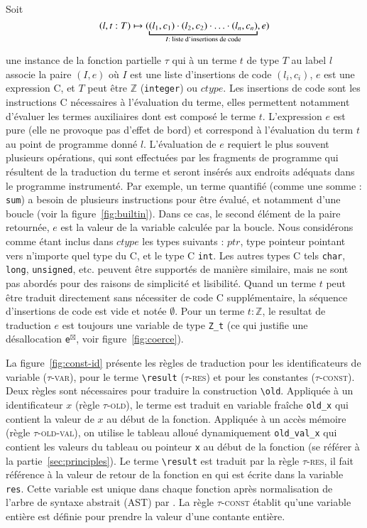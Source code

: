 

Soit
\[
(l, t:T) \rulearrow (\underbracket{(l_1, c_1) \concat (l_2, c_2) \concat \ldots
  \concat (l_n, c_n)}_{I : \text{ liste d'insertions de code}}, e)
\]

une instance de la fonction partielle $\tau$ qui à un terme \eacsl $t$ de type
$T$ au label $l$ associe la paire $(I, e)$ où $I$ est une liste d'insertions de
code $(l_i, c_i)$, $e$ est une expression C, et $T$ peut être $\mathbb{Z}$
(\lstinline'integer') ou $ctype$.
Les insertions de code sont les instructions C nécessaires à l'évaluation du
terme, elles permettent notamment d'évaluer les termes auxiliaires dont est
composé le terme $t$.
L'expression $e$ est pure (elle ne provoque pas d'effet de bord) et correspond
à l'évaluation du term $t$ au point de programme donné $l$.
L'évaluation de $e$ requiert le plus souvent plusieurs opérations, qui sont
effectuées par les fragments de programme qui résultent de la traduction du
terme et seront insérés aux endroits adéquats dans le programme instrumenté.
Par exemple, un terme quantifié (comme une somme : \lstinline'sum') a besoin de
plusieurs instructions pour être évalué, et notamment d'une boucle (voir la
figure~\ref{fig:builtin}).
Dans ce cas, le second élément de la paire retournée, $e$ est la valeur de la
variable calculée par la boucle.
Nous considérons comme étant inclus dans $ctype$ les types suivants : $ptr$,
type pointeur pointant vers n'importe quel type du C, et le type C
\lstinline'int'.
Les autres types C tels \lstinline'char', \lstinline'long',
\lstinline'unsigned', etc. peuvent être supportés de manière similaire, mais ne
sont pas abordés pour des raisons de simplicité et lisibilité.
Quand un terme $t$ peut être traduit directement sans nécessiter de code C
supplémentaire, la séquence d'insertions de code est vide et notée $\emptyset$.
Pour un terme $t:\mathbb{Z}$, le resultat de traduction $e$ est toujours une
variable de type \lstinline'Z_t' (ce qui justifie une désallocation
\lstinline{e}${}^{\boxtimes}$, voir figure~\ref{fig:coerce}).

La figure~\ref{fig:const-id} présente les règles de traduction pour les
identificateurs de variable (\textsc{$\tau$-var}), pour le terme
\lstinline|\result| (\textsc{$\tau$-res}) et pour les constantes
(\textsc{$\tau$-const}).
Deux règles sont nécessaires pour traduire la construction \eacsl
\lstinline|\old|.
Appliquée à un identificateur $x$ (règle \textsc{$\tau$-old}), le terme est
traduit en variable fraîche \lstinline|old_x| qui contient la valeur de $x$ au
début de la fonction.
Appliquée à un accès mémoire (règle \textsc{$\tau$-old-val}), on utilise le
tableau alloué dynamiquement \lstinline|old_val_x| qui contient les valeurs du
tableau ou pointeur \lstinline'x' au début de la fonction (se référer à la
partie~\ref{sec:principles}).
Le terme \lstinline|\result| est traduit par la règle \textsc{$\tau$-res}, il
fait référence à la valeur de retour de la fonction en \eacsl qui est écrite
dans la variable \lstinline|res|.
Cette variable est unique dans chaque fonction après normalisation de l'arbre de
syntaxe abstrait (AST) par \framac.
La règle \textsc{$\tau$-const} établit qu'une variable entière est définie pour
prendre la valeur d'une contante entière.

